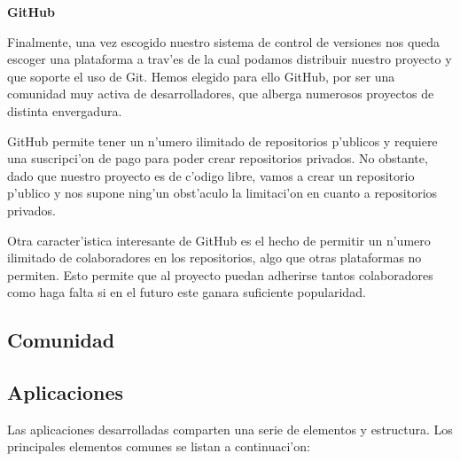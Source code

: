 \textbf{GitHub}

Finalmente, una vez escogido nuestro sistema de control de versiones nos queda escoger una plataforma a trav'es de la
cual podamos distribuir nuestro proyecto y que soporte el uso de Git. Hemos elegido para ello GitHub, por ser una
comunidad muy activa de desarrolladores, que alberga numerosos proyectos de distinta envergadura.

GitHub permite tener un n'umero ilimitado de repositorios p'ublicos y requiere una suscripci'on de pago para poder
crear repositorios privados. No obstante, dado que nuestro proyecto es de c'odigo libre, vamos a crear un repositorio
p'ublico y nos supone ning'un obst'aculo la limitaci'on en cuanto a repositorios privados.

Otra caracter'istica interesante de GitHub es el hecho de permitir un n'umero ilimitado de colaboradores en los
repositorios, algo que otras plataformas no permiten. Esto permite que al proyecto puedan adherirse tantos
colaboradores como haga falta si en el futuro este ganara suficiente popularidad.


\subsection{Comunidad}
\label{sec:comunidad}


\subsection{Aplicaciones}
\label{sec:aplicaciones}

Las aplicaciones desarrolladas comparten una serie de elementos y estructura. Los principales 
elementos comunes se listan a continuaci'on:

